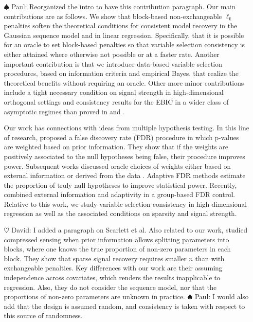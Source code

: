 \documentclass[aos]{imsart}
\theoremstyle{plain}
\newcommand{\david}[1]{{\small{\color{blue} \sf $\heartsuit$ David: #1}}}
\newcommand{\paul}[1]{{\small{\color{green} \sf $\spadesuit$ Paul: #1}}}
\begin{document}
\paul{Reorganized the intro to have this contribution paragraph.}
Our main contributions are as follows. We show that block-based non-exchangeable $\ell_0$ penalties soften
the theoretical conditions for consistent model recovery in the Gaussian sequence model and in linear regression. %
Specifically, %
that it is possible for an oracle to set block-based penalties so that variable selection consistency is either attained where otherwise not possible or at a faster rate. Another important contribution is that we introduce data-based variable selection procedures, %
based on information criteria and empirical Bayes, that realize the theoretical benefits without requiring an oracle. Other more minor contributions include a tight necessary condition on signal strength in high-dimensional orthogonal settings and consistency results for the EBIC in a wider class of asymptotic regimes than proved in \cite{EBIC} and \cite{ebicdiverging}.

Our work has connections with ideas from multiple hypothesis testing. In this line of research, \cite{genovese2006} proposed a false discovery rate (FDR) %
procedure in which p-values are weighted based on prior information. They show that if the weights are positively associated to the null hypotheses being false, their procedure improves power. Subsequent works discussed oracle choices of weights either based on external information or derived from the data %
\cite{roederwasserman,basu}. 
Adaptive FDR methods \cite{blanchard} estimate the %
proportion of truly null hypotheses to improve statistical power.
Recently, \cite{ramdas2019prior} combined external information %
and adaptivity in a group-based FDR control. 
Relative to this work, we study %
variable selection consistency in high-dimensional regression %
as well as the associated conditions on sparsity and signal strength.

\david{I added a paragraph on Scarlett et al.}
\color{blue} Also related to our work, \cite{scarlett2012compressed} studied compressed sensing when prior information allows splitting parameters into blocks, where one knows the true proportion of non-zero parameters in each block. They show that sparse signal recovery requires smaller $n$ than with exchangeable penalties. Key differences with our work are their assuming independence across covariates, which renders the results inapplicable to regression. Also, they do not consider the sequence model, nor that the proportions of non-zero parameters are unknown in practice.   \color{black} \paul{I would also add that the design is assumed random, and consistency is taken with respect to this source of randomness.}
\end{document}
